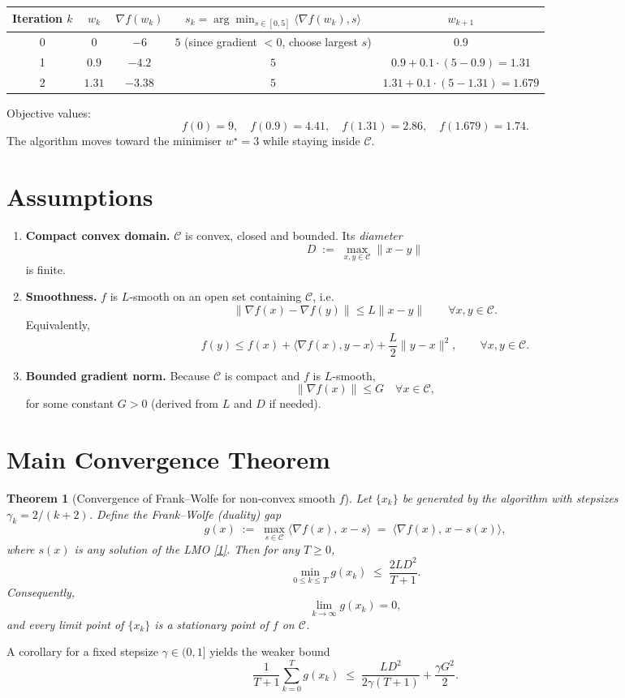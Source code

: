 \documentclass{article}
\newtheorem{theorem}{Theorem}
\begin{document}
\begin{center}
\begin{tabular}{c|c|c|c|c}
Iteration $k$ & $w_k$ & $\nabla f(w_k)$ & $s_k=\arg\min_{s\in[0,5]}\langle\nabla f(w_k),s\rangle$ & $w_{k+1}$ \\
\hline
0 & $0$ & $-6$ & $5$ (since gradient $<0$, choose largest $s$) & $0.9$ \\
1 & $0.9$ & $-4.2$ & $5$ & $0.9+0.1\cdot(5-0.9)=1.31$ \\
2 & $1.31$ & $-3.38$ & $5$ & $1.31+0.1\cdot(5-1.31)=1.679$ \\
\end{tabular}
\end{center}
Objective values:
\[
f(0)=9,\quad f(0.9)=4.41,\quad f(1.31)=2.86,\quad f(1.679)=1.74 .
\]
The algorithm moves toward the minimiser $w^\star=3$ while staying inside $\mathcal{C}$.

\section*{Assumptions}
\begin{enumerate}[label={A\arabic*:}, leftmargin=*]
\item \textbf{Compact convex domain.} $\mathcal{C}$ is convex, closed and bounded. Its \emph{diameter}
\[
D \;:=\; \max_{x,y\in\mathcal{C}}\|x-y\|
\]
is finite.
\item \textbf{Smoothness.} $f$ is $L$‑smooth on an open set containing $\mathcal{C}$, i.e.
\[
\|\nabla f(x)-\nabla f(y)\|\le L\|x-y\|\qquad\forall x,y\in\mathcal{C}.
\tag{A2}
\]
Equivalently,
\[
f(y)\le f(x)+\langle\nabla f(x),y-x\rangle+\frac{L}{2}\|y-x\|^{2},\qquad\forall x,y\in\mathcal{C}.
\tag{A2$'$}
\]
\item \textbf{Bounded gradient norm.} Because $\mathcal{C}$ is compact and $f$ is $L$‑smooth,
\[
\|\nabla f(x)\|\le G \quad\forall x\in\mathcal{C},
\]
for some constant $G>0$ (derived from $L$ and $D$ if needed).
\end{enumerate}

\section*{Main Convergence Theorem}
\begin{theorem}[Convergence of Frank–Wolfe for non‑convex smooth $f$]
\label{thm:fw}
Let $\{x_k\}$ be generated by the algorithm with stepsizes $\gamma_k=2/(k+2)$.  
Define the \emph{Frank–Wolfe (duality) gap}
\[
g(x)\;:=\;\max_{s\in\mathcal{C}}\langle\nabla f(x),\,x-s\rangle
      \;=\;\langle\nabla f(x),\,x-s(x)\rangle,
\tag{3}
\]
where $s(x)$ is any solution of the LMO \eqref{1}.  
Then for any $T\ge0$,
\[
\min_{0\le k\le T} g(x_k)
\;\le\;
\frac{2L D^{2}}{T+1}.
\tag{4}
\]
Consequently,
\[
\lim_{k\to\infty} g(x_k)=0,
\]
and every limit point of $\{x_k\}$ is a \emph{stationary point} of $f$ on $\mathcal{C}$.
\end{theorem}
A corollary for a fixed stepsize $\gamma\in(0,1]$ yields the weaker bound
\[
\frac{1}{T+1}\sum_{k=0}^{T} g(x_k)
\;\le\;
\frac{LD^{2}}{2\gamma (T+1)}+\frac{\gamma G^{2}}{2}.
\tag{5}
\]
\end{document}
